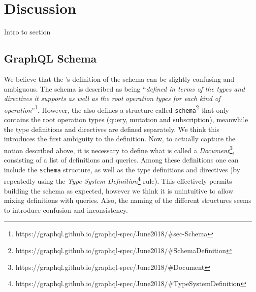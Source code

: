 \section{Discussion}\label{sec:discussion}
Intro to section

\subsection{GraphQL Schema}

We believe that the \spec{}'s definition of the schema can be slightly confusing and ambiguous. The schema is described as being ``\textit{defined in terms of the types and directives it supports as well as the root operation types for each kind of operation}''\footnote{https://graphql.github.io/graphql-spec/June2018/\#sec-Schema}. However, the \spec{} also defines a structure called \texttt{schema}\footnote{https://graphql.github.io/graphql-spec/June2018/\#SchemaDefinition} that only contains the root operation types (query, mutation and subscription), meanwhile the type definitions and directives are defined separately. We think this introduces the first ambiguity to the definition. Now, to actually capture the notion described above, it is necessary to define what is called a \textit{Document}\footnote{https://graphql.github.io/graphql-spec/June2018/\#Document}, consisting of a list of definitions and queries. Among these definitions one can include the \texttt{schema} structure, as well as the type definitions and directives (by repeatedly using the \textit{Type System Definition}\footnote{https://graphql.github.io/graphql-spec/June2018/\#TypeSystemDefinition} rule). This effectively permits building the schema as expected, however we think it is unintuitive to allow mixing definitions with queries. Also, the naming of the different structures seems to introduce confusion and inconsistency.

 




